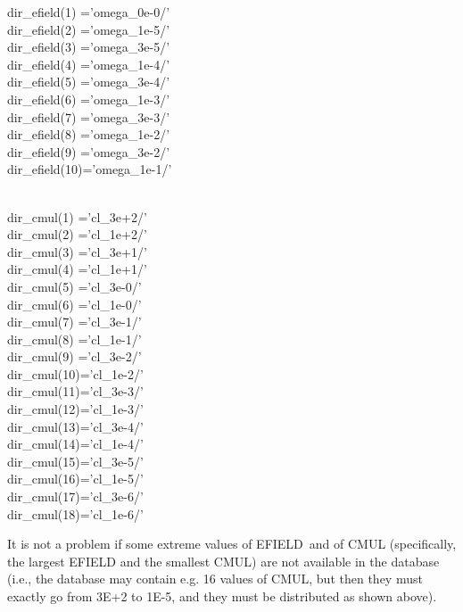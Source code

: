 {\ttfamily
  \hskip-0.6cm dir\_efield(1) ='omega\_0e-0/'\\
  dir\_efield(2) ='omega\_1e-5/'\\
  dir\_efield(3) ='omega\_3e-5/'\\
  dir\_efield(4) ='omega\_1e-4/'\\
  dir\_efield(5) ='omega\_3e-4/'\\
  dir\_efield(6) ='omega\_1e-3/'\\
  dir\_efield(7) ='omega\_3e-3/'\\
  dir\_efield(8) ='omega\_1e-2/'\\
  dir\_efield(9) ='omega\_3e-2/'\\
  dir\_efield(10)='omega\_1e-1/'\\

\

  \hskip-0.6cm  dir\_cmul(1) ='cl\_3e+2/'\\
  dir\_cmul(2) ='cl\_1e+2/'\\
  dir\_cmul(3) ='cl\_3e+1/'\\
  dir\_cmul(4) ='cl\_1e+1/'\\
  dir\_cmul(5) ='cl\_3e-0/'\\
  dir\_cmul(6) ='cl\_1e-0/'\\
  dir\_cmul(7) ='cl\_3e-1/'\\
  dir\_cmul(8) ='cl\_1e-1/'\\
  dir\_cmul(9) ='cl\_3e-2/'\\
  dir\_cmul(10)='cl\_1e-2/'\\
  dir\_cmul(11)='cl\_3e-3/'\\
  dir\_cmul(12)='cl\_1e-3/'\\
  dir\_cmul(13)='cl\_3e-4/'\\
  dir\_cmul(14)='cl\_1e-4/'\\
  dir\_cmul(15)='cl\_3e-5/'\\
  dir\_cmul(16)='cl\_1e-5/'\\
  dir\_cmul(17)='cl\_3e-6/'\\
  dir\_cmul(18)='cl\_1e-6/'\\
}

It is not a problem if some extreme values of {\ttfamily EFIELD}~and of {\ttfamily CMUL} (specifically, the largest {\ttfamily EFIELD} and the smallest {\ttfamily CMUL}) are not available in the database (i.e., the database may contain e.g. 16 values of {\ttfamily CMUL}, but then they must exactly go from 3E+2 to 1E-5, and they must be distributed as shown above).

\

